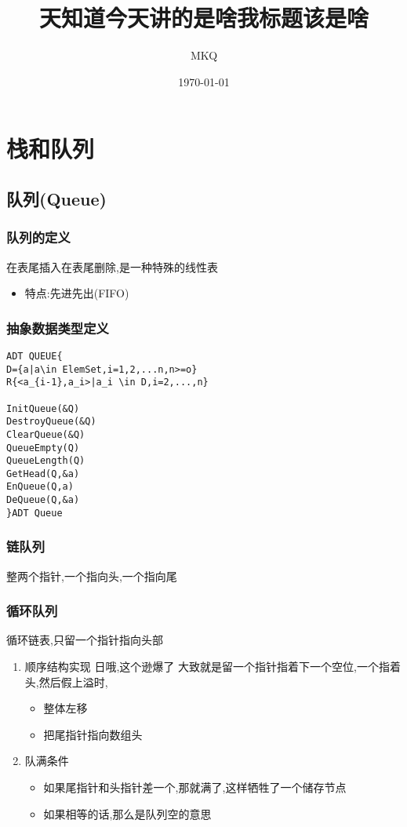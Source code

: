 \documentclass[11pt]{article}
\author{MKQ}
\date{\today}
\title{天知道今天讲的是啥我标题该是啥}
\begin{document}
\maketitle
\tableofcontents

\section{栈和队列}
\label{sec:org9acebd3}
\subsection{队列(Queue)}
\label{sec:org0b4edd7}
\subsubsection{队列的定义}
\label{sec:orgd26df6a}
在表尾插入在表尾删除,是一种特殊的线性表
\begin{itemize}
\item 特点:先进先出(FIFO)
\end{itemize}
\subsubsection{抽象数据类型定义}
\label{sec:org0f394e4}
\begin{verbatim}
ADT QUEUE{
D={a|a\in ElemSet,i=1,2,...n,n>=o}
R{<a_{i-1},a_i>|a_i \in D,i=2,...,n}

InitQueue(&Q)
DestroyQueue(&Q)
ClearQueue(&Q)
QueueEmpty(Q)
QueueLength(Q)
GetHead(Q,&a)
EnQueue(Q,a)
DeQueue(Q,&a)
}ADT Queue
\end{verbatim}
\subsubsection{链队列}
\label{sec:org20d6844}
整两个指针,一个指向头,一个指向尾
\subsubsection{循环队列}
\label{sec:org6f06aad}
循环链表,只留一个指针指向头部
\begin{enumerate}
\item 顺序结构实现
\label{sec:orgecbf1d1}
日哦,这个逊爆了
大致就是留一个指针指着下一个空位,一个指着头,然后假上溢时,
\begin{itemize}
\item 整体左移
\item 把尾指针指向数组头
\end{itemize}
\item 队满条件
\label{sec:orgd34a421}
\begin{itemize}
\item 如果尾指针和头指针差一个,那就满了,这样牺牲了一个储存节点
\item 如果相等的话,那么是队列空的意思
\end{itemize}
\end{enumerate}
\end{document}
